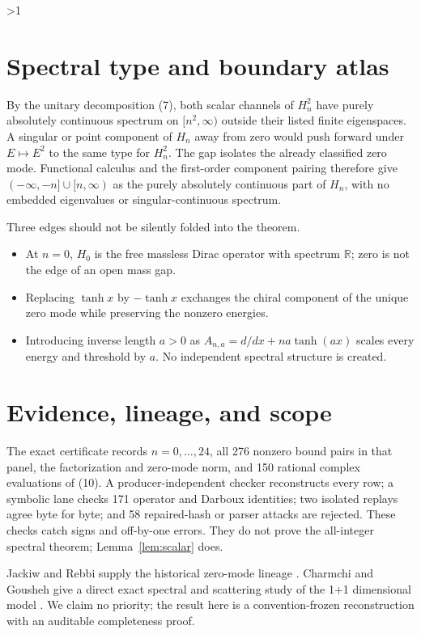 \documentclass[10pt]{article}
\providecommand{\CRevisionRound}{2}
\theoremstyle{remark}
\newcommand{\R}{\mathbb R}
\begin{document}
\ifnum\CRevisionRound>1
\section{Spectral type and boundary atlas}

By the unitary decomposition (7), both scalar channels of $H_n^2$ have
purely absolutely continuous spectrum on $[n^2,\infty)$ outside their
listed finite eigenspaces.  A singular or point component of $H_n$ away
from zero would push forward under $E\mapsto E^2$ to the same type for
$H_n^2$.  The gap isolates the already classified zero mode.  Functional
calculus and the first-order component pairing therefore give
$(-\infty,-n]\cup[n,\infty)$ as the purely absolutely continuous part of
$H_n$, with no embedded eigenvalues or singular-continuous spectrum.

Three edges should not be silently folded into the theorem.
\begin{itemize}
\item At $n=0$, $H_0$ is the free massless Dirac operator with spectrum
$\R$; zero is not the edge of an open mass gap.
\item Replacing $\tanh x$ by $-\tanh x$ exchanges the chiral component of
the unique zero mode while preserving the nonzero energies.
\item Introducing inverse length $a>0$ as
$A_{n,a}=d/dx+na\tanh(ax)$ scales every energy and threshold by $a$.
No independent spectral structure is created.
\end{itemize}

\section{Evidence, lineage, and scope}

The exact certificate records $n=0,\ldots,24$, all 276 nonzero bound pairs
in that panel, the factorization and zero-mode norm, and 150 rational
complex evaluations of (10).  A producer-independent checker reconstructs
every row; a symbolic lane checks 171 operator and Darboux identities; two
isolated replays agree byte for byte; and 58 repaired-hash or parser attacks
are rejected.  These checks catch signs and off-by-one errors.  They do not
prove the all-integer spectral theorem; Lemma~\ref{lem:scalar} does.

Jackiw and Rebbi supply the historical zero-mode lineage
\cite{jackiwrebbi}.  Charmchi and Gousheh give a direct exact spectral and
scattering study of the 1+1 dimensional model \cite{charmchi}.  We claim no
priority; the result here is a convention-frozen reconstruction with an
auditable completeness proof.
\end{document}
